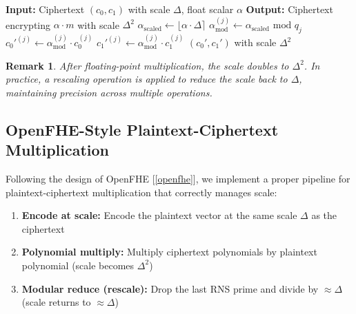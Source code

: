 \documentclass[11pt,a4paper]{article}
\newtheorem{remark}{Remark}
\newcommand{\bmod}{\text{ mod }}
\begin{document}
\begin{algorithm}[H]
\caption{Floating-Point Scalar Multiplication}
\begin{algorithmic}[1]
    \State \textbf{Input:} Ciphertext $(c_0, c_1)$ with scale $\Delta$, float scalar $\alpha$
    \State \textbf{Output:} Ciphertext encrypting $\alpha \cdot m$ with scale $\Delta^2$
    \State
    \State {}
    \State $\alpha_{\text{scaled}} \gets \lfloor \alpha \cdot \Delta \rceil$
    \State
        \State $\alpha_{\text{mod}}^{(j)} \gets \alpha_{\text{scaled}} \bmod q_j$
        \State $c_0'^{(j)} \gets \alpha_{\text{mod}}^{(j)} \cdot c_0^{(j)}$
        \State $c_1'^{(j)} \gets \alpha_{\text{mod}}^{(j)} \cdot c_1^{(j)}$
    \EndFor
    \State
    \State \Return $(c_0', c_1')$ with scale $\Delta^2$
\EndFunction
\end{algorithmic}
\end{algorithm}

\begin{remark}
After floating-point multiplication, the scale doubles to $\Delta^2$. In practice, a \emph{rescaling} operation is applied to reduce the scale back to $\Delta$, maintaining precision across multiple operations.
\end{remark}

\subsection{OpenFHE-Style Plaintext-Ciphertext Multiplication}

Following the design of OpenFHE [\ref{openfhe}], we implement a proper pipeline for plaintext-ciphertext multiplication that correctly manages scale:

\begin{enumerate}
    \item \textbf{Encode at scale:} Encode the plaintext vector at the same scale $\Delta$ as the ciphertext
    \item \textbf{Polynomial multiply:} Multiply ciphertext polynomials by plaintext polynomial (scale becomes $\Delta^2$)
    \item \textbf{Modular reduce (rescale):} Drop the last RNS prime and divide by $\approx \Delta$ (scale returns to $\approx \Delta$)
\end{enumerate}
\end{document}
